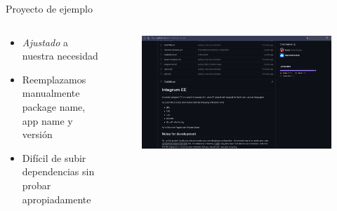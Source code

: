 \documentclass[aspectratio=169]{beamer}
\begin{document}
\begin{frame}{Proyecto de ejemplo}

\begin{columns}[T] %
\begin{column}[T]{4cm} %
        \begin{itemize}
           \item \textit{Ajustado} a nuestra necesidad
           \item Reemplazamos manualmente package name, app name y versión
           \item Difícil de subir dependencias sin probar apropiadamente
        \end{itemize}
\end{column}
\begin{column}[T]{10cm} %

\begin{figure}
        \centering
        \includegraphics[width=0.9\linewidth]{Images/integrum.png}
        \label{fig:integrum}
    \end{figure}
\end{column}
\end{columns}

\end{frame}
\end{document}
